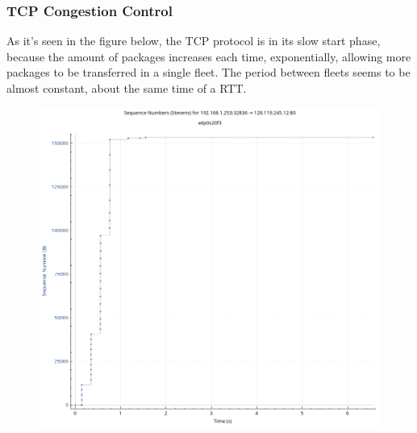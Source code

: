 \subsubsection{TCP Congestion Control}

As it's seen in the figure below, the TCP protocol is in its slow start phase, because the amount of packages increases each time, exponentially, allowing more packages to be transferred in a single fleet. The period between fleets seems to be almost constant, about the same time of a RTT.

\begin{figure}[htbp]
	\centering
	\includegraphics[width=1\linewidth]{img/fourth_experience/2.png}
	\caption{}\label{fig:4_1}
\end{figure}

